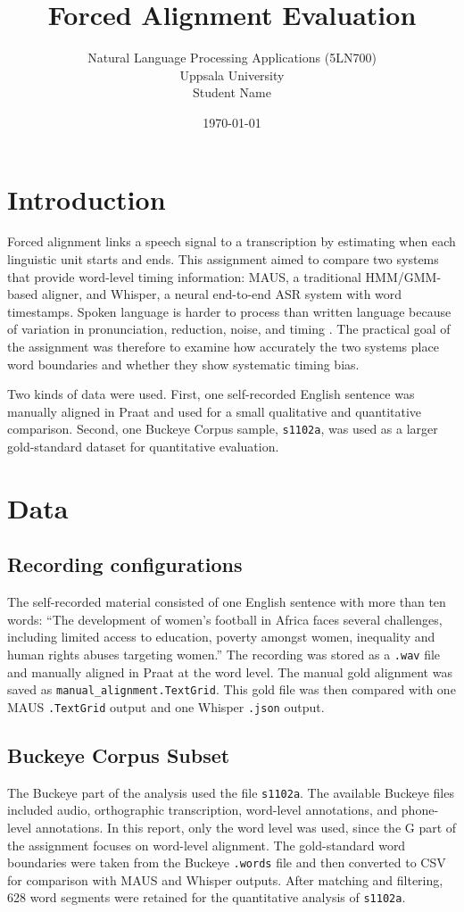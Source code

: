 \documentclass[11pt]{article}
\title{Forced Alignment Evaluation}
\author{
  Natural Language Processing Applications (5LN700) \\
  Uppsala University \\
  Student Name
}
\date{\today}
\begin{document}
\maketitle

\section{Introduction}
Forced alignment links a speech signal to a transcription by estimating when each linguistic unit starts and ends. This assignment aimed to compare two systems that provide word-level timing information: MAUS, a traditional HMM/GMM-based aligner, and Whisper, a neural end-to-end ASR system with word timestamps. Spoken language is harder to process than written language because of variation in pronunciation, reduction, noise, and timing \citep[p.~5]{jm3}. The practical goal of the assignment was therefore to examine how accurately the two systems place word boundaries and whether they show systematic timing bias.

Two kinds of data were used. First, one self-recorded English sentence was manually aligned in Praat and used for a small qualitative and quantitative comparison. Second, one Buckeye Corpus sample, \texttt{s1102a}, was used as a larger gold-standard dataset for quantitative evaluation.

\section{Data}
\subsection{Recording configurations}
The self-recorded material consisted of one English sentence with more than ten words: ``The development of women's football in Africa faces several challenges, including limited access to education, poverty amongst women, inequality and human rights abuses targeting women.'' The recording was stored as a \texttt{.wav} file and manually aligned in Praat at the word level. The manual gold alignment was saved as \texttt{manual\_alignment.TextGrid}. This gold file was then compared with one MAUS \texttt{.TextGrid} output and one Whisper \texttt{.json} output.

\subsection{Buckeye Corpus Subset}
The Buckeye part of the analysis used the file \texttt{s1102a}. The available Buckeye files included audio, orthographic transcription, word-level annotations, and phone-level annotations. In this report, only the word level was used, since the G part of the assignment focuses on word-level alignment. The gold-standard word boundaries were taken from the Buckeye \texttt{.words} file and then converted to CSV for comparison with MAUS and Whisper outputs. After matching and filtering, 628 word segments were retained for the quantitative analysis of \texttt{s1102a}.
\end{document}
